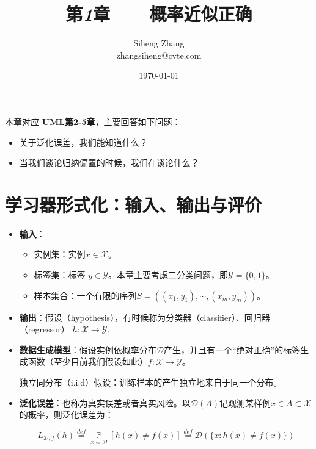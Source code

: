 \documentclass{article}
\author{Siheng Zhang\\zhangsiheng@cvte.com}
\title{第\textbf{\textit{1}}章\ \ \ \ 概率近似正确}
\date{\today}
\begin{document}
\maketitle  


本章对应 \textbf{UML第2-5章}，主要回答如下问题：

\begin{itemize}
\item 关于泛化误差，我们能知道什么？
\item 当我们谈论归纳偏置的时候，我们在谈论什么？
\end{itemize}

\tableofcontents
\newpage

\section{学习器形式化：输入、输出与评价}

\begin{itemize}

	\item \textbf{输入}：
	
	\begin{itemize}
	\item 实例集：实例$x \in \mathcal{X}$。
	\item 标签集：标签 $y \in \mathcal{Y}$。本章主要考虑二分类问题，即$\mathcal{Y}=\{0,1\}$。
	\item 样本集合：一个有限的序列$S=((x_1,y_1),\cdots,(x_m,y_m))$。
	\end{itemize}	 

	\item \textbf{输出}：假设（hypothesis），有时候称为分类器（classifier）、回归器（regressor） $h:\mathcal{X}\rightarrow\mathcal{Y}$.

	\item \textbf{数据生成模型}：假设实例依概率分布$\mathcal{D}$产生，并且有一个“绝对正确”的标签生成函数（至少目前我们假设如此）$f:\mathcal{X}\rightarrow\mathcal{Y}$。
	
	独立同分布（i.i.d）假设：训练样本的产生独立地来自于同一个分布。
	
	\item \textbf{泛化误差}：也称为真实误差或者真实风险。以$\mathcal{D}(A)$记观测某样例$x \in A \subset \mathcal{X}$的概率，则泛化误差为：
	
	\begin{equation}
	L_{\mathcal{D},f}(h)\overset{def}{=}\mathop{\mathbb{P}}\limits_{x\sim\mathcal{D}}[h(x)\neq f(x)]\overset{def}{=}\mathcal{D}(\{x:h(x)\neq f(x)\})
	\end{equation}
	
\end{itemize}
\end{document}
